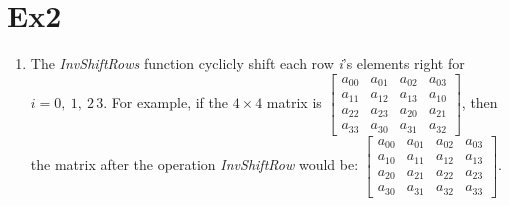 \documentclass[12pt, a4paper]{article}
\begin{document}
\section{Ex2}
\begin{enumerate}
    \item The \emph{InvShiftRows} function cyclicly shift each row \emph{i}'s elements right for $i = 0,\ 1,\ 2\, 3$.\newline
          For example, if the $4\times 4$ matrix is 
          $\begin{bmatrix} a_{00} & a_{01} & a_{02} & a_{03}\\
            a_{11} & a_{12} & a_{13} & a_{10}\\
            a_{22} & a_{23} & a_{20} & a_{21}\\
            a_{33} & a_{30} & a_{31} & a_{32}
            \end{bmatrix}$, then the matrix after the operation \emph{InvShiftRow} would be: 
          $\begin{bmatrix} a_{00} & a_{01} & a_{02} & a_{03}\\
            a_{10} & a_{11} & a_{12} & a_{13}\\
            a_{20} & a_{21} & a_{22} & a_{23}\\
            a_{30} & a_{31} & a_{32} & a_{33}
           \end{bmatrix}$.
\end{enumerate}
\end{document}
